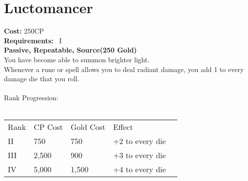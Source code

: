 \section{Luctomancer}\label{perk:luctomancer}
\textbf{Cost:} 250CP\\
\textbf{Requirements:}~ I\\
\textbf{Passive, Repeatable, Source(250 Gold)}\\
You have become able to summon brighter light.\\
Whenever a rune or spell allows you to deal radiant damage, you add 1 to every damage die that you roll.\\
\\
Rank Progression:\\
\\
\begin{tabular}{l | l | l | l | l}
    Rank & CP Cost & Gold Cost &  Effect\\
    II & 750 & 750 & +2 to every die\\
    III & 2,500 & 900 & +3 to every die\\
    IV & 5,000 & 1,500 & +4 to every die\\
\end{tabular}